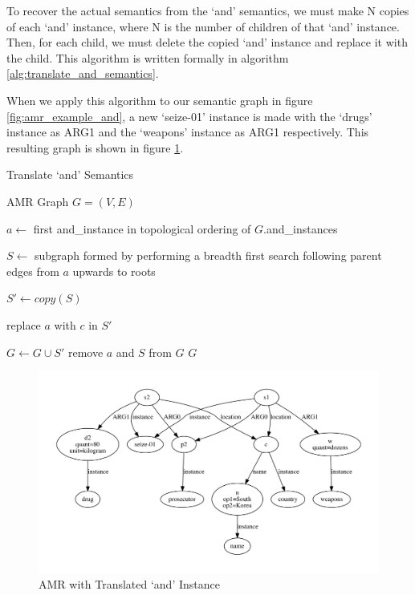 \documentclass[12pt]{article}
\begin{document}
To recover the actual semantics from the `and' semantics, we must make N copies of each `and' instance, where N is the number of children of that `and' instance. Then, for each child, we must delete the copied `and' instance and replace it with the child. This algorithm is written formally in algorithm \ref{alg:translate_and_semantics}.

When we apply this algorithm to our semantic graph in figure \ref{fig:amr_example_and}, a new `seize-01' instance is made with the `drugs' instance as ARG1 and the `weapons' instance as ARG1 respectively. This resulting graph is shown in figure \ref{fig:amr_example_and_removed}.

\begin{algorithm}
\caption{Translate `and' Semantics}
\label{alg:translate_and_semantics}
\begin{algorithmic}[1]
\REQUIRE AMR Graph $G = (V, E)$

    \STATE $a \gets$ first and\_instance in topological ordering of $G$.and\_instances

    \STATE $S \gets$ subgraph formed by performing a breadth first search following parent edges from $a$ upwards to roots

        \STATE $S' \gets copy(S)$

        \STATE replace $a$ with $c$ in $S'$

        \STATE $G \gets G \cup S'$
    \ENDFOR
    \STATE remove $a$ and $S$ from $G$
\ENDWHILE
\RETURN $G$
\end{algorithmic}
\end{algorithm}

\begin{figure}
\includegraphics[width=\linewidth]{amr_example_and_removed.pdf}
\caption{AMR with Translated `and' Instance}
\label{fig:amr_example_and_removed}
\end{figure}
\end{document}
